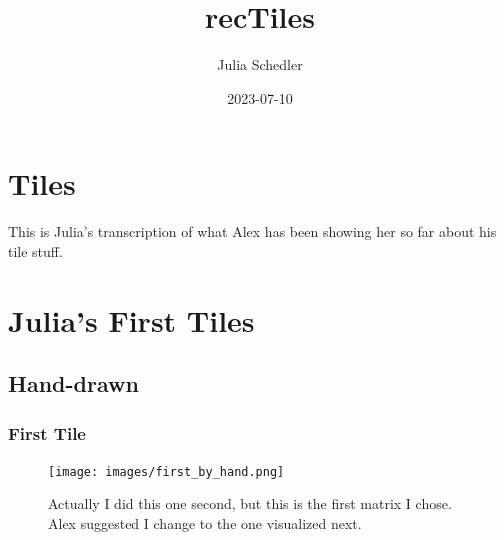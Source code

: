 \documentclass[
  letterpaper,
  DIV=11,
  numbers=noendperiod]{scrreprt}
\title{recTiles}
\author{Julia Schedler}
\date{2023-07-10}
\renewcommand*\contentsname{Table of contents}
\newcommand\contentsname{Table of contents}
\begin{document}
\maketitle
\ifdefined\Shaded\renewenvironment{Shaded}{\begin{tcolorbox}[sharp corners, enhanced, interior hidden, boxrule=0pt, breakable, borderline west={3pt}{0pt}{shadecolor}, frame hidden]}{\end{tcolorbox}}\fi

\renewcommand*\contentsname{Table of contents}
{
\hypersetup{linkcolor=}
\setcounter{tocdepth}{2}
\tableofcontents
}

\hypertarget{tiles}{%
\chapter*{Tiles}\label{tiles}}


This is Julia's transcription of what Alex has been showing her so far
about his tile stuff.


\hypertarget{julias-first-tiles}{%
\chapter*{Julia's First Tiles}\label{julias-first-tiles}}


\hypertarget{hand-drawn}{%
\section*{Hand-drawn}\label{hand-drawn}}


\hypertarget{first-tile}{%
\subsection*{First Tile}\label{first-tile}}

\begin{figure}

{\centering \texttt{[image: images/first\_by\_hand.png]}

}

\caption{Actually I did this one second, but this is the first matrix I
chose. Alex suggested I change to the one visualized next.}

\end{figure}
\end{document}
